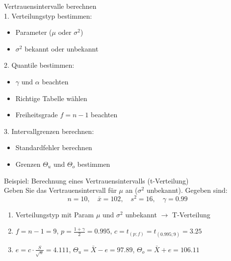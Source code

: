 \begin{KR}{Vertrauensintervalle berechnen}\\
1. Verteilungstyp bestimmen:
   \begin{itemize}
     \item Parameter ($\mu$ oder $\sigma^2$)
     \item $\sigma^2$ bekannt oder unbekannt
   \end{itemize}

2. Quantile bestimmen:
   \begin{itemize}
     \item $\gamma$ und $\alpha$ beachten
     \item Richtige Tabelle wählen
     \item Freiheitsgrade $f=n-1$ beachten
   \end{itemize}

3. Intervallgrenzen berechnen:
   \begin{itemize}
     \item Standardfehler berechnen
     \item Grenzen $\Theta_u$ und $\Theta_o$ bestimmen
   \end{itemize}
\end{KR}

\begin{example2}{Beispiel: Berechnung eines Vertrauensintervalls (t-Verteilung)}\\
Geben Sie das Vertrauensintervall für $\mu$ an ($\sigma^2$ unbekannt). Gegeben sind:
$$
n=10, \quad \bar{x}=102, \quad s^2=16, \quad \gamma=0.99
$$

\begin{enumerate}
  \item Verteilungstyp mit Param $\mu$ und $\sigma^2$ unbekannt $\rightarrow$ T-Verteilung
  \item $f=n-1=9$, $p=\frac{1+\gamma}{2}=0.995$, $c=t_{(p;f)}=t_{(0.995;9)}=3.25$
  \item $e=c \cdot \frac{S}{\sqrt{n}}=4.111$, $\Theta_u=\bar{X}-e=97.89$, $\Theta_o=\bar{X}+e=106.11$
\end{enumerate}
\end{example2}

